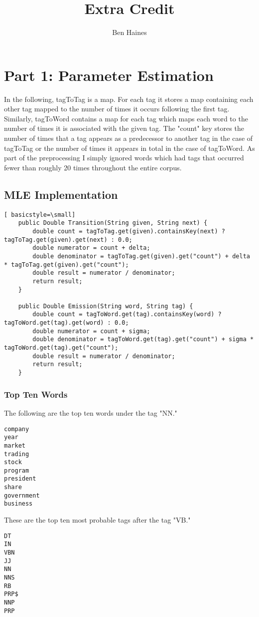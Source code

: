 \documentclass[paper=a4, fontsize=11pt]{jhwhw} %
\begin{document}
\title{Extra Credit}
\author{Ben Haines}

\section{Part 1: Parameter Estimation}
In the following, tagToTag is a map. For each tag it stores a map containing each other tag mapped to the number of times it
occurs following the first tag. Similarly, tagToWord contains a map for each tag which maps each word to the number of times it
is associated with the given tag. The "count" key stores the number of times that a tag appears
as a predecessor to another tag in the case of tagToTag or the number of times it appears in total in the case of tagToWord.
As part of the preprocessing I simply ignored words which had tags that occurred fewer than roughly 20 times throughout the entire corpus. 

\subsection{MLE Implementation}
\begin{lstlisting}[ basicstyle=\small]
    public Double Transition(String given, String next) {
        double count = tagToTag.get(given).containsKey(next) ? tagToTag.get(given).get(next) : 0.0;
        double numerator = count + delta;
        double denominator = tagToTag.get(given).get("count") + delta * tagToTag.get(given).get("count");
        double result = numerator / denominator;
        return result;
    }

    public Double Emission(String word, String tag) {
        double count = tagToWord.get(tag).containsKey(word) ? tagToWord.get(tag).get(word) : 0.0;
        double numerator = count + sigma;
        double denominator = tagToWord.get(tag).get("count") + sigma * tagToWord.get(tag).get("count");
        double result = numerator / denominator;
        return result;
    }
\end{lstlisting}

\subsubsection{Top Ten Words}
The following are the top ten words under the tag "NN."
\begin{verbatim}
company
year	
market
trading
stock
program
president
share
government
business
\end{verbatim}

These are the top ten most probable tags after the tag "VB."
\begin{verbatim}
DT
IN
VBN
JJ
NN
NNS
RB
PRP$
NNP
PRP
\end{verbatim}
\end{document}
